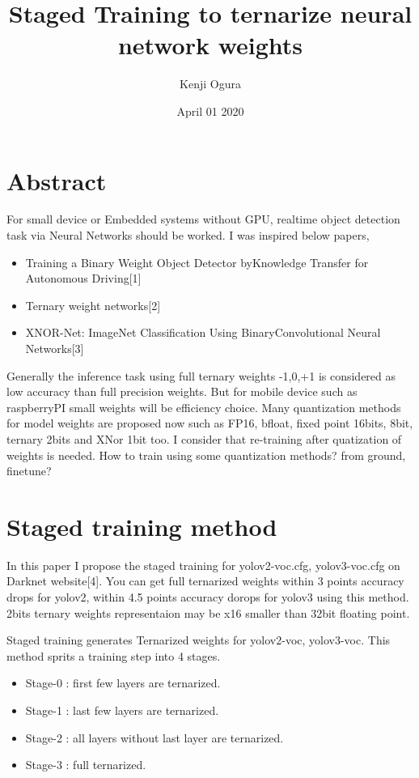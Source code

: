 \documentclass[twocolumn]{article}
\begin{document}
\title{Staged Training to ternarize neural network weights}
\author{Kenji Ogura}
\date{April 01 2020}
\maketitle

\section{Abstract}

For small device or Embedded systems without GPU, realtime object detection task via Neural Networks should be worked.
I was inspired below papers,
\begin{itemize}
\item
 Training a Binary Weight Object Detector byKnowledge Transfer for Autonomous Driving[1]
\item
 Ternary weight networks[2]
\item
 XNOR-Net: ImageNet Classification Using BinaryConvolutional Neural Networks[3]
\end{itemize}

Generally the inference task using full ternary weights -1,0,+1 is considered as low accuracy than full precision weights.
But for mobile device such as raspberryPI small weights will be efficiency choice.
Many quantization methods for model weights are proposed now such as FP16, bfloat, fixed point 16bits, 8bit, ternary 2bits and XNor 1bit too.
I consider that re-training after quatization of weights is needed.
How to train using some quantization methods? from ground, finetune?

\section{Staged training method}
In this paper I propose the staged training for yolov2-voc.cfg, yolov3-voc.cfg on Darknet website[4].
You can get full ternarized weights within 3 points accuracy drops for yolov2, within 4.5 points accuracy dorops for yolov3 using this method.
2bits ternary weights representaion may be x16 smaller than 32bit floating point.

Staged training generates Ternarized weights for yolov2-voc, yolov3-voc.
This method sprits a training step into 4 stages.

\begin{itemize}
\item Stage-0 : first few layers are ternarized.
\item Stage-1 : last few layers are ternarized.
\item Stage-2 : all layers without last layer are ternarized.
\item Stage-3 : full ternarized.
\end{itemize}
\end{document}
